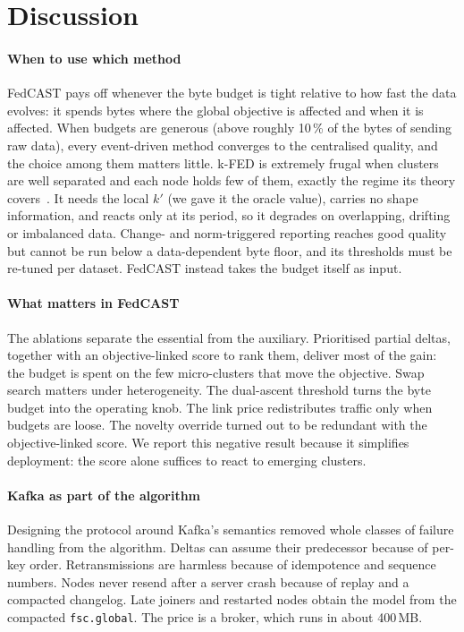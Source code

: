 \section{Discussion}\label{sec:discussion}

\paragraph{When to use which method} FedCAST pays off whenever the byte budget is tight relative to how fast the data evolves: it spends bytes where the global objective is affected and when it is affected. When budgets are generous (above roughly 10\,\% of the bytes of sending raw data), every event-driven method converges to the centralised quality, and the choice among them matters little. k-FED is extremely frugal when clusters are well separated and each node holds few of them, exactly the regime its theory covers~\cite{dennis2021kfed}. It needs the local $k'$ (we gave it the oracle value), carries no shape information, and reacts only at its period, so it degrades on overlapping, drifting or imbalanced data. Change- and norm-triggered reporting reaches good quality but cannot be run below a data-dependent byte floor, and its thresholds must be re-tuned per dataset. FedCAST instead takes the budget itself as input.

\paragraph{What matters in FedCAST} The ablations separate the essential from the auxiliary. Prioritised partial deltas, together with an objective-linked score to rank them, deliver most of the gain: the budget is spent on the few micro-clusters that move the objective. Swap search matters under heterogeneity. The dual-ascent threshold turns the byte budget into the operating knob. The link price redistributes traffic only when budgets are loose. The novelty override turned out to be redundant with the objective-linked score. We report this negative result because it simplifies deployment: the score alone suffices to react to emerging clusters.

\paragraph{Kafka as part of the algorithm} Designing the protocol around Kafka's semantics removed whole classes of failure handling from the algorithm. Deltas can assume their predecessor because of per-key order. Retransmissions are harmless because of idempotence and sequence numbers. Nodes never resend after a server crash because of replay and a compacted changelog. Late joiners and restarted nodes obtain the model from the compacted \texttt{fsc.global}. The price is a broker, which runs in about 400\,MB.

